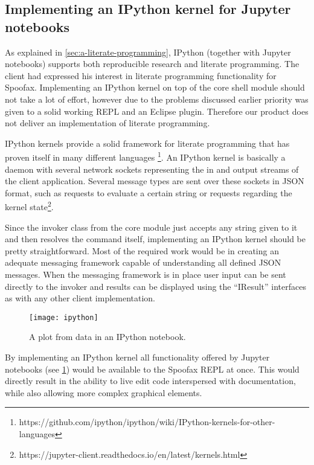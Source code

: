 \subsection{Implementing an IPython kernel for Jupyter notebooks}
\label{sec:literate-programming}

As explained in \cref{sec:a-literate-programming}, IPython (together with
Jupyter notebooks) supports both reproducible research and literate
programming. The client had expressed his interest in literate programming
functionality for Spoofax. Implementing an IPython kernel on top of the core
shell module should not take a lot of effort, however due to the problems
discussed earlier priority was given to a solid working REPL and an Eclipse
plugin. Therefore our product does not deliver an implementation of literate
programming.

IPython kernels provide a solid framework for literate programming that has
proven itself in many different languages
\footnote{https://github.com/ipython/ipython/wiki/IPython-kernels-for-other-languages}.
An IPython kernel is basically a daemon with several network sockets
representing the in and output streams of the client application. Several
message types are sent over these sockets in JSON format, such as requests to
evaluate a certain string or requests regarding the kernel
state\footnote{https://jupyter-client.readthedocs.io/en/latest/kernels.html}.

Since the invoker class from the core module just accepts any string given to
it and then resolves the command itself, implementing an IPython kernel should
be pretty straightforward. Most of the required work would be in creating an
adequate messaging framework capable of understanding all defined JSON
messages. When the messaging framework is in place user input can be sent
directly to the invoker and results can be displayed using the ``IResult''
interfaces as with any other client implementation.

\begin{figure}[htb]
  \centering
  \texttt{[image: ipython]}
  \caption{A plot from data in an IPython notebook.}
  \label{fig:ipython}
\end{figure}

By implementing an IPython kernel all functionality offered by Jupyter
notebooks (see \cref{fig:ipython}) would be available to the Spoofax REPL at
once. This would directly result in the ability to live edit code interspersed
with documentation, while also allowing more complex graphical elements.

